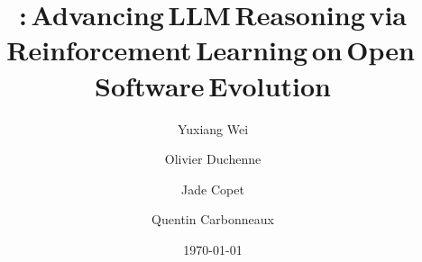 \documentclass[]{fairmeta}
\title{\tech:\,Advancing\,LLM\,Reasoning\,via Reinforcement\,Learning\,on\,Open\,Software\,Evolution}
\author[1,2]{Yuxiang Wei}
\author[1]{Olivier Duchenne}
\author[1]{Jade Copet}
\author[1]{Quentin Carbonneaux}
\affiliation[1]{FAIR at Meta}
\affiliation[2]{University of Illinois Urbana-Champaign}
\date{\today}
\begin{document}
\maketitle












\clearpage
\newpage



\clearpage
\newpage
\beginappendix


\end{document}
